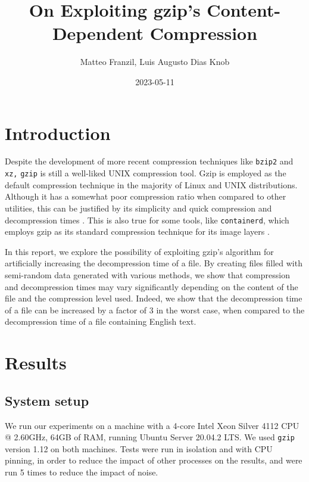 \documentclass[a4paper,10pt,compsoc,conference]{IEEEtran}
\author{Matteo Franzil, Luis Augusto Dias Knob}
\date{2023-05-11}
\title{On Exploiting gzip's Content-Dependent Compression}
\begin{document}
\maketitle
\setlength{\parskip}{1pt}

\section{Introduction}
\label{sec:org59100cf}

Despite the development of more recent compression techniques like \texttt{bzip2}
and \texttt{xz,} \texttt{gzip} is still a well-liked UNIX compression tool. Gzip is
employed as the default compression technique in the majority of Linux and
UNIX distributions. Although it has a somewhat poor compression ratio when
compared to other utilities, this can be justified by its simplicity and
quick compression and decompression times
\citep{GNUGzip,deutschDEFLATECompressedData1996}. This is also true for some
tools, like \texttt{containerd}, which employs gzip as its standard compression
technique for its image layers
\citep{MakeImageLayer,SupportParallelDecompression}.

In this report, we explore the possibility of exploiting gzip's
algorithm for artificially increasing the decompression time of a file. By
creating files filled with semi-random data generated with various methods,
we show that compression and decompression times may vary significantly
depending on the content of the file and the compression level used. Indeed,
we show that the decompression time of a file can be increased by a factor of
3 in the worst case, when compared to the decompression time of a file
containing English text.

\section{Results}
\label{sec:orgaa19a4e}

\subsection{System setup}
\label{sec:org65c231c}

We run our experiments on a machine with a 4-core Intel Xeon Silver 4112 CPU
@ 2.60GHz, 64GB of RAM, running Ubuntu Server 20.04.2 LTS. We used \texttt{gzip}
version 1.12 on both machines. Tests were run in isolation and with
CPU pinning, in order to reduce the impact of other processes on the results,
and were run 5 times to reduce the impact of noise.
\end{document}

